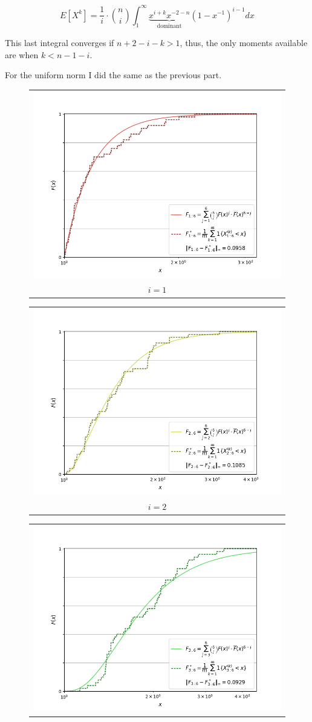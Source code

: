 \[ E[X^k] = \frac{1}{i}\cdot\binom{n}{i} \int_{1}^\infty \underbrace{x^{i+k} x^{-2-n}}_{\text{dominant}} {(1-x^{-1})}^{i-1} dx \]

This last integral converges if $n+2-i-k > 1$, thus, the only moments available are when $k < n-1-i$.

For the uniform norm I did the same as the previous part.

\newpage

\begin{figure}[H]
    \centering
    \begin{tabular}{@{}c@{}}
        \includegraphics[trim={1.1cm 0.5cm 1.5cm 0cm}, clip,width=.46\linewidth]{../simulation/pareto_order_1:6.png} \\
        $i = 1$
      \end{tabular}
    \begin{tabular}{@{}c@{}}
        \includegraphics[trim={1.1cm 0.5cm 1.5cm 0cm}, clip,width=.46\linewidth]{../simulation/pareto_order_2:6.png} \\
        $i = 2$
    \end{tabular}
    \begin{tabular}{@{}c@{}}
        \includegraphics[trim={1.1cm 0.5cm 1.5cm 0cm}, clip,width=.46\linewidth]{../simulation/pareto_order_3:6.png} \\

\end{tabular}
\end{figure}
